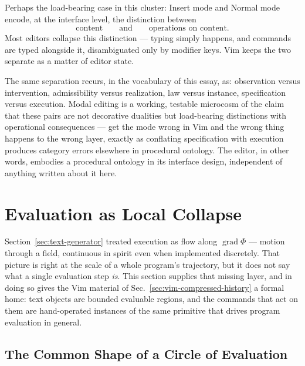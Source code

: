 \documentclass[12pt,a4paper]{article}
\theoremstyle{plain}
\theoremstyle{definition}
\theoremstyle{remark}
\newcommand{\Phifield}{\Phi}
\begin{document}
Perhaps the load-bearing case in this cluster: Insert mode and Normal mode encode, at the interface level, the distinction between
\[
\text{content} \qquad \text{and} \qquad \text{operations on content}.
\]
Most editors collapse this distinction — typing simply happens, and commands are typed alongside it, disambiguated only by modifier keys. Vim keeps the two separate as a matter of editor state.

The same separation recurs, in the vocabulary of this essay, as: observation versus intervention, admissibility versus realization, law versus instance, specification versus execution. Modal editing is a working, testable microcosm of the claim that these pairs are not decorative dualities but load-bearing distinctions with operational consequences — get the mode wrong in Vim and the wrong thing happens to the wrong layer, exactly as conflating specification with execution produces category errors elsewhere in procedural ontology. The editor, in other words, embodies a procedural ontology in its interface design, independent of anything written about it here.

\section{Evaluation as Local Collapse}
\label{sec:evaluation-local-collapse}

Section~\ref{sec:text-generator} treated execution as flow along $\operatorname{grad}\Phifield$ — motion through a field, continuous in spirit even when implemented discretely. That picture is right at the scale of a whole program's trajectory, but it does not say what a single evaluation step \emph{is}. This section supplies that missing layer, and in doing so gives the Vim material of Sec.~\ref{sec:vim-compressed-history} a formal home: text objects are bounded evaluable regions, and the commands that act on them are hand-operated instances of the same primitive that drives program evaluation in general.

\subsection{The Common Shape of a Circle of Evaluation}
\label{subsec:circles-of-evaluation}
\end{document}
